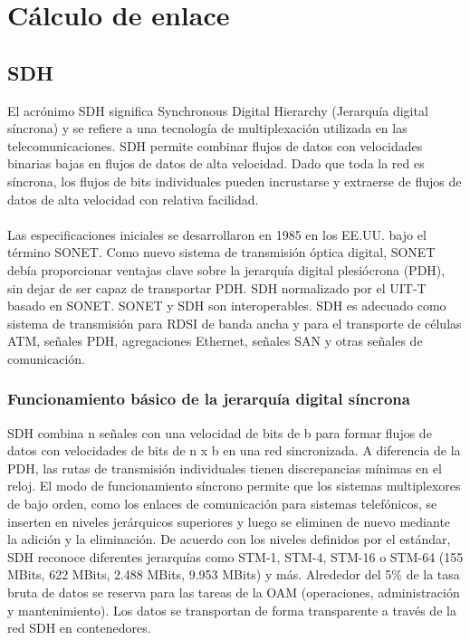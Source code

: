 \documentclass[12pt,letterpaper]{article}
\begin{document}
\newpage
\section{Cálculo de enlace}
\subsection{SDH}
El acrónimo SDH significa Synchronous Digital Hierarchy (Jerarquía digital síncrona) y se 
refiere a una tecnología de multiplexación utilizada en las telecomunicaciones. SDH permite 
combinar flujos de datos con velocidades binarias bajas en flujos de datos de alta velocidad. 
Dado que toda la red es síncrona, los flujos de bits individuales pueden incrustarse y 
extraerse de flujos de datos de alta velocidad con relativa facilidad.
\\ \\
Las especificaciones iniciales se desarrollaron en 1985 en los EE.UU. bajo el término SONET. 
Como nuevo sistema de transmisión óptica digital, SONET debía proporcionar ventajas clave 
sobre la jerarquía digital plesiócrona (PDH), sin dejar de ser capaz de transportar PDH. 
SDH normalizado por el UIT-T basado en SONET. SONET y SDH son interoperables. SDH es 
adecuado como sistema de transmisión para RDSI de banda ancha y para el transporte de 
células ATM, señales PDH, agregaciones Ethernet, señales SAN y otras señales de comunicación.

\subsubsection{Funcionamiento básico de la jerarquía digital síncrona}
SDH combina n señales con una velocidad de bits de b para formar flujos de datos con 
velocidades de bits de n x b en una red sincronizada. A diferencia de la PDH, las rutas de 
transmisión individuales tienen discrepancias mínimas en el reloj. El modo de 
funcionamiento síncrono permite que los sistemas multiplexores de bajo orden, como los 
enlaces de comunicación para sistemas telefónicos, se inserten en niveles jerárquicos 
superiores y luego se eliminen de nuevo mediante la adición y la eliminación. De acuerdo 
con los niveles definidos por el estándar, SDH reconoce diferentes jerarquías como STM-1, 
STM-4, STM-16 o STM-64 (155 MBits, 622 MBits, 2.488 MBits, 9.953 MBits) y más. Alrededor 
del 5\% de la tasa bruta de datos se reserva para las tareas de la OAM (operaciones, 
administración y mantenimiento). Los datos se transportan de forma transparente a través 
de la red SDH en contenedores.
\end{document}
